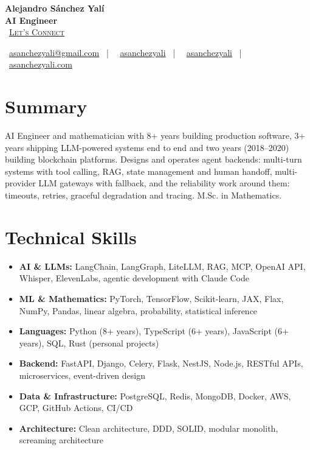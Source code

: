 \documentclass[letterpaper,10pt]{article}
\newcommand{\normalfaCalendar}{{\mdseries\faCalendar}}
\newcommand{\normalfaEnvelope}{{\mdseries\faEnvelope}}
\newcommand{\normalfaLinkedin}{{\mdseries\faLinkedin}}
\newcommand{\normalfaGithub}{{\mdseries\faGithub}}
\newcommand{\normalfaGlobe}{{\mdseries\faGlobe}}
\begin{document}
\begin{center}
\textbf{\LARGE Alejandro S\'anchez Yal\'i}\\[0.2em]
\textbf{\Large AI Engineer}\\[0.4em]
\small
\normalfaCalendar\ \href{https://cal.com/asanchezyali/full-time-opportunities}{\textsc{Let's Connect}}

\vspace{0.5em}
\normalfaEnvelope\ \href{mailto:asanchezyali@gmail.com}{asanchezyali@gmail.com}  ~|~
\normalfaLinkedin\ \href{https://www.linkedin.com/in/asanchezyali}{asanchezyali} ~|~
\normalfaGithub\ \href{https://github.com/asanchezyali}{asanchezyali}  ~|~
\normalfaGlobe\ \href{https://asanchezyali.com}{asanchezyali.com}
\end{center}


\section{Summary}
AI Engineer and mathematician with 8+ years building production software, 3+ years shipping LLM-powered systems end to end and two years (2018--2020) building blockchain platforms. Designs and operates agent backends: multi-turn systems with tool calling, RAG, state management and human handoff, multi-provider LLM gateways with fallback, and the reliability work around them: timeouts, retries, graceful degradation and tracing. M.Sc. in Mathematics.

\section{Technical Skills}
\begin{itemize}[leftmargin=*, itemsep=0pt]
  \item \textbf{AI \& LLMs:} LangChain, LangGraph, LiteLLM, RAG, MCP, OpenAI API, Whisper, ElevenLabs, agentic development with Claude Code
  \item \textbf{ML \& Mathematics:} PyTorch, TensorFlow, Scikit-learn, JAX, Flax, NumPy, Pandas, linear algebra, probability, statistical inference
  \item \textbf{Languages:} Python (8+ years), TypeScript (6+ years), JavaScript (6+ years), SQL, Rust (personal projects)
  \item \textbf{Backend:} FastAPI, Django, Celery, Flask, NestJS, Node.js, RESTful APIs, microservices, event-driven design
  \item \textbf{Data \& Infrastructure:} PostgreSQL, Redis, MongoDB, Docker, AWS, GCP, GitHub Actions, CI/CD
  \item \textbf{Architecture:} Clean architecture, DDD, SOLID, modular monolith, screaming architecture
\end{itemize}
\end{document}
